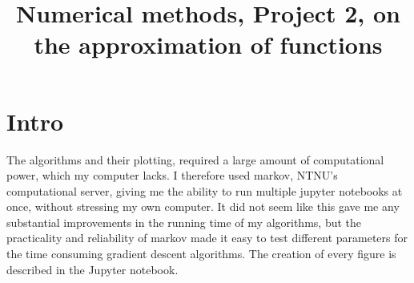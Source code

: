 \title{Numerical methods, Project 2, on the approximation of functions}
\maketitle
\newpage
\section{Intro}
The algorithms and their plotting, required a large amount of computational power, which my computer lacks. I therefore used markov, NTNU's computational server, giving me the ability to run multiple jupyter notebooks at once, without stressing my own computer. It did not seem like this gave me any substantial improvements in the running time of my algorithms, but the practicality and reliability of markov made it easy to test different parameters for the time consuming gradient descent algorithms.
\newline The creation of every figure is described in the Jupyter notebook.

